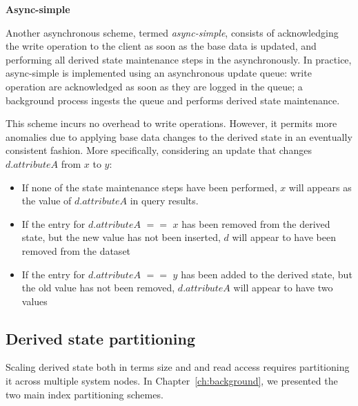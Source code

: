 \bigskip
\noindent
\textbf{Async-simple}

\noindent
Another asynchronous scheme, termed \textit{async-simple}, consists of acknowledging the write operation to
the client as soon as the base data is updated,
and performing all derived state maintenance steps in the asynchronously.
In practice, async-simple is implemented using an asynchronous update queue:
write operation are acknowledged as soon as they are logged in the queue;
a background process ingests the queue and performs derived state maintenance.

This scheme incurs no overhead to write operations.
However, it permits more anomalies due to applying base data changes to the derived state in an eventually consistent fashion.
More specifically, considering an update that changes $d.attributeA$ from $x$ to $y$:
\begin{itemize}
  \item If none of the state maintenance steps have been performed, $x$ will appears as the value of $d.attributeA$
  in query results.

  \item If the entry for $d.attributeA$ $==$ $x$ has been removed from the derived state, but the new value has not been
  inserted, $d$ will appear to have been removed from the dataset

  \item If the entry for $d.attributeA$ $==$ $y$ has been added to the derived state, but the old value has not been
  removed, $d.attributeA$ will appear to have two values
\end{itemize}


\subsection{Derived state partitioning}
\label{sec:index_partitioning_design_space}


Scaling derived state both in terms size and and read access requires partitioning it across multiple system nodes.
In Chapter~\ref{ch:background}, we presented the two main index partitioning schemes.

